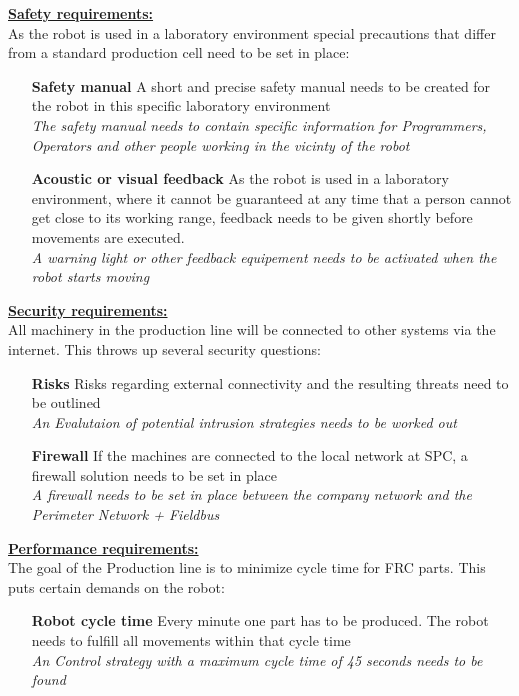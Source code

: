 %
\underline{\textbf{Safety requirements:}}\vspace{2mm}\\
As the robot is used in a laboratory environment special precautions that differ from a standard production cell need to be set in place:\\
\begin{itemize}[leftmargin=5cm]
	\item[\textbf{Safety manual}] A short and precise safety manual needs to be created for the robot in this specific laboratory environment\\
	\textit{The safety manual needs to contain specific information for Programmers, Operators and other people working in the vicinty of the robot }
	\item[\textbf{Acoustic or visual feedback}] As the robot is used in a laboratory environment, where it cannot be guaranteed at any time that a person cannot get close to its working range, feedback needs to be given shortly before movements are executed.	\\
	\textit{A warning light or other feedback equipement needs to be activated when the robot starts moving}
\end{itemize}
%
\underline{\textbf{Security requirements:}}\vspace{2mm}\\
All machinery in the production line will be connected to other systems via the internet. This throws up several security questions:\\
\begin{itemize}[leftmargin=5cm]
	\item[\textbf{Risks}] Risks regarding external connectivity and the resulting threats need to be outlined\\
	\textit{An Evalutaion of potential intrusion strategies needs to be worked out}
	\item[\textbf{Firewall}] If the machines are connected to the local network at SPC, a firewall solution needs to be set in place\\
	\textit{A firewall needs to be set in place between the company network and the Perimeter Network + Fieldbus}
\end{itemize}
%
\underline{\textbf{Performance requirements:}}\vspace{2mm}\\
The goal of the Production line is to minimize cycle time for FRC parts. This puts certain demands on the robot:\\
\begin{itemize}[leftmargin=5cm]
	\item[\textbf{Robot cycle time}] Every minute one part has to be produced. The robot needs to fulfill all movements within that cycle time\\
	\textit{An Control strategy with a maximum cycle time of 45 seconds needs to be found}
\end{itemize}
